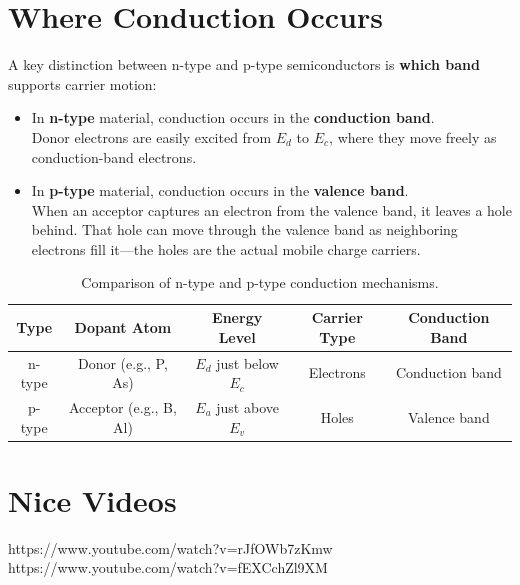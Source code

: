 \documentclass[12pt]{article}
\begin{document}
	\section{Where Conduction Occurs}
	A key distinction between n-type and p-type semiconductors is \textbf{which band} supports carrier motion:
	\begin{itemize}
		\item In \textbf{n-type} material, conduction occurs in the \textbf{conduction band}.\\
		Donor electrons are easily excited from \(E_d\) to \(E_c\), where they move freely as conduction-band electrons.
		\item In \textbf{p-type} material, conduction occurs in the \textbf{valence band}.\\
		When an acceptor captures an electron from the valence band, it leaves a hole behind. 
		That hole can move through the valence band as neighboring electrons fill it---the holes are the actual mobile charge carriers.
	\end{itemize}
	
	\begin{table}[h!]
		\centering
		\renewcommand{\arraystretch}{1.2}
		\begin{tabular}{|c|c|c|c|c|}
			\hline
			\textbf{Type} & \textbf{Dopant Atom} & \textbf{Energy Level} & \textbf{Carrier Type} & \textbf{Conduction Band} \\
			\hline
			n-type & Donor (e.g., P, As) & \(E_d\) just below \(E_c\) & Electrons & Conduction band \\
			\hline
			p-type & Acceptor (e.g., B, Al) & \(E_a\) just above \(E_v\) & Holes & Valence band \\
			\hline
		\end{tabular}
		\caption{Comparison of n-type and p-type conduction mechanisms.}
	\end{table}
	
	\section{Nice Videos}
	https://www.youtube.com/watch?v=rJfOWb7zKmw\\
	https://www.youtube.com/watch?v=fEXCchZl9XM
	
\end{document}
